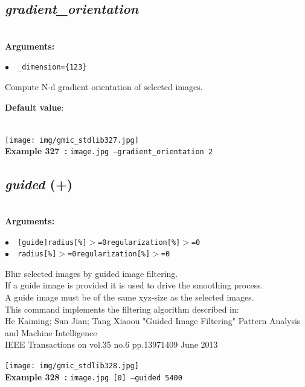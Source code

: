 \documentclass[a4paper,10.5pt,twoside]{book}
\def\comma{\discretionary{,}{}{,}}
\newcommand{\Cb}[1]{\textcolor{cb}{#1}}
\newcommand{\Cc}[1]{\textcolor{cc}{#1}}
\begin{document}
\subsection{\emph{gradient\_orientation} }\vspace*{-0.7em}
~\\\textbf{\Cb{Arguments: }}\begin{flushleft}
{\small \Cb{\hspace*{0.5cm}$\bullet$~~\texttt{\_dimension=\{1{\comma}2{\comma}3\}}}}\end{flushleft}
Compute N-d gradient orientation of selected images.
\begin{flushleft}\Cc{\textbf{Default value}:\\~\\\hspace*{0.5cm}{\small $\bullet$~~\texttt{'dimension=3'.}}}\end{flushleft}
\begin{center}\texttt{[image: img/gmic\_stdlib327.jpg]}\\
{\footnotesize \textbf{Example 327~:} \texttt{image.jpg --gradient\_orientation 2}}
\end{center}

\subsection{\emph{guided} (+)}\vspace*{-0.7em}
~\\\textbf{\Cb{Arguments: }}\begin{flushleft}
{\small \Cb{\hspace*{0.5cm}$\bullet$~~\texttt{[guide]{\comma}radius[\%]$>$=0{\comma}regularization[\%]$>$=0}}}~~~\\
{\small \Cb{\hspace*{0.5cm}$\bullet$~~\texttt{radius[\%]$>$=0{\comma}regularization[\%]$>$=0}}}\end{flushleft}
Blur selected images by guided image filtering.
~\\If a guide image is provided{\comma} it is used to drive the smoothing process.
~\\A guide image must be of the same xyz-size as the selected images.
~\\This command implements the filtering algorithm described in:
~\\He{\comma} Kaiming; Sun{\comma} Jian; Tang{\comma} Xiaoou{\comma} "Guided Image Filtering{\comma}" Pattern Analysis and Machine Intelligence{\comma}
~\\IEEE Transactions on {\comma} vol.35{\comma} no.6{\comma} pp.1397{\comma}1409{\comma} June 2013
\begin{center}\texttt{[image: img/gmic\_stdlib328.jpg]}\\
{\footnotesize \textbf{Example 328~:} \texttt{image.jpg [0] --guided 5{\comma}400}}
\end{center}
\end{document}
